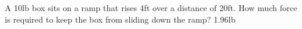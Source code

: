 {A 10lb box sits on a ramp that rises 4ft over a distance of 20ft. How much force is required to keep the box from sliding down the ramp?
}
{1.96lb
}
